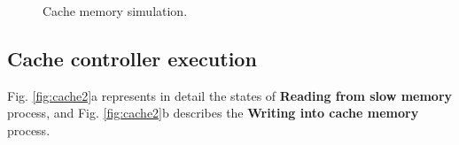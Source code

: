 \documentclass[]{article}
\begin{document}
\begin{figure}[H]
	\centering
	\caption{Cache memory simulation.}
	\label{fig:cache1}
\end{figure}

\subsection{Cache controller execution}
Fig. \ref{fig:cache2}a represents in detail the states of \textbf{Reading from slow memory} process, and Fig. \ref{fig:cache2}b describes the \textbf{Writing into cache memory} process.
\end{document}
